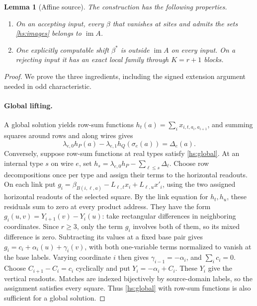 \documentclass[11pt]{article}
\newtheorem{lemma}[theorem]{Lemma}
\theoremstyle{definition}
\theoremstyle{remark}
\numberwithin{equation}{section}
\begin{document}
\begin{lemma}[Affine source]
\label{hs:source}
The construction has the following properties.
\begin{enumerate}
\item On an accepting input, every \(\beta\) that vanishes at sites
and admits the sets \eqref{hs:images} belongs to \(\operatorname{im}A\).
\item One explicitly computable shift \(\beta^*\) is outside
\(\operatorname{im}A\) on every input.  On a rejecting input it has
an exact local family through \(K=r+1\) blocks.
\end{enumerate}
\end{lemma}
\begin{proof}
We prove the three ingredients, including the signed extension
argument needed in odd characteristic.

\paragraph{Global lifting.}
A global solution yields row-sum functions
\(h_t(a)=\sum_i x_{i,t,a_i,a_{i+1}}\), and summing squares around rows
and along wires gives
\begin{equation}
 \lambda_{e,0}h_P(a)-\lambda_{e,1}h_Q(\sigma_e(a))=\Delta_e(a).
 \label{hs:global}
\end{equation}
Conversely, suppose row-sum functions at real types satisfy
\eqref{hs:global}.  At an internal type \(s\) on wire \(e\), set
\(h_s=\lambda_{e,0}h_P-\sum_{\ell\leq s}\Delta_\ell\).
Choose row decompositions once per type and assign their terms to the
horizontal readouts.  On each link put $g_i=\beta_{B(i,\ell,a)}-L_{\ell,t}x_i+
L_{\ell,u}x'_i$, using the two assigned horizontal readouts of the
selected square. By the link equation for $h_t,h_u$, these residuals
sum to zero at every product address.
They have the form \(g_i(u,v)=Y_{i+1}(v)-Y_i(u)\):
take rectangular differences in neighboring coordinates. Since $r\ge3$, only the term $g_i$ involves both of them, so its mixed difference is zero. Subtracting its values at a fixed base pair gives
\(g_i=c_i+\alpha_i(u)+\gamma_i(v)\), with both one-variable terms normalized to vanish at the base labels. Varying coordinate \(i\) then gives
\(\gamma_{i-1}=-\alpha_i\), and \(\sum_i c_i=0\).
Choose \(C_{i+1}-C_i=c_i\) cyclically and put \(Y_i=-\alpha_i+C_i\).
These \(Y_i\) give the vertical readouts.
Matches are indexed bijectively by source-domain labels, so the
assignment satisfies every square.  Thus \eqref{hs:global} with
row-sum functions is also sufficient for a global solution.


\end{proof}
\end{document}
